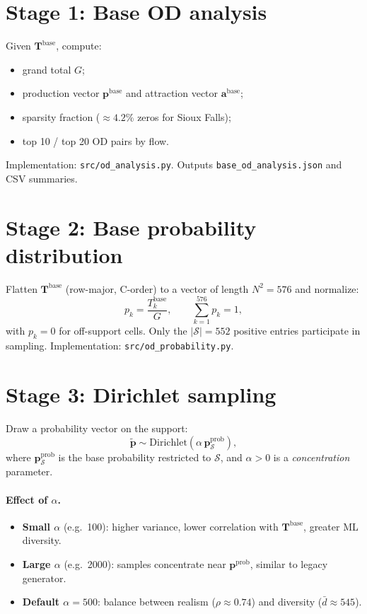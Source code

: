 \documentclass[11pt,a4paper]{report}
\newcommand{\Tbase}{\mathbf{T}^{\mathrm{base}}}
\newcommand{\mathbfp}{\mathbf{p}}
\newcommand{\mathbfa}{\mathbf{a}}
\begin{document}
\section{Stage 1: Base OD analysis}

Given $\Tbase$, compute:
\begin{itemize}[noitemsep]
    \item grand total $G$;
    \item production vector $\mathbfp^{\mathrm{base}}$ and attraction vector $\mathbfa^{\mathrm{base}}$;
    \item sparsity fraction ($\approx 4.2\%$ zeros for Sioux Falls);
    \item top 10 / top 20 OD pairs by flow.
\end{itemize}
Implementation: \texttt{src/od\_analysis.py}. Outputs \texttt{base\_od\_analysis.json} and CSV summaries.

\section{Stage 2: Base probability distribution}

Flatten $\Tbase$ (row-major, C-order) to a vector of length $N^2=576$ and normalize:
\begin{equation}
    p_k = \frac{T^{\mathrm{base}}_k}{G}, \qquad \sum_{k=1}^{576} p_k = 1,
\end{equation}
with $p_k=0$ for off-support cells. Only the $|\mathcal{S}|=552$ positive entries participate in sampling. Implementation: \texttt{src/od\_probability.py}.

\section{Stage 3: Dirichlet sampling}

Draw a probability vector on the support:
\begin{equation}
    \tilde{\mathbfp} \sim \mathrm{Dirichlet}(\alpha\,\mathbfp^{\mathrm{prob}}_{\mathcal{S}}),
    \label{eq:dirichlet}
\end{equation}
where $\mathbfp^{\mathrm{prob}}_{\mathcal{S}}$ is the base probability restricted to $\mathcal{S}$, and $\alpha>0$ is a \emph{concentration} parameter.

\paragraph{Effect of $\alpha$.}
\begin{itemize}[noitemsep]
    \item \textbf{Small $\alpha$} (e.g.\ 100): higher variance, lower correlation with $\Tbase$, greater ML diversity.
    \item \textbf{Large $\alpha$} (e.g.\ 2000): samples concentrate near $\mathbfp^{\mathrm{prob}}$, similar to legacy generator.
    \item \textbf{Default $\alpha=500$}: balance between realism ($\rho\approx 0.74$) and diversity ($\bar{d}\approx 545$).
\end{itemize}
\end{document}
